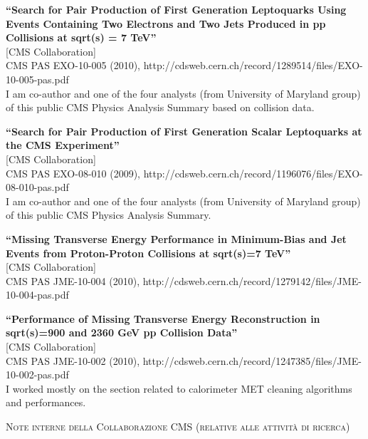 \documentclass[10pt, a4paper]{article}
\begin{document}
\begin{thebibliography}{599}
{\bf ``Search for Pair Production of First Generation Leptoquarks Using Events Containing Two Electrons and Two Jets Produced in pp Collisions at sqrt(s) = 7 TeV''}
  \\{}[CMS Collaboration]
  \\{}CMS PAS EXO-10-005 (2010), http://cdsweb.cern.ch/record/1289514/files/EXO-10-005-pas.pdf 
  \\I am co-author and one of the four analysts (from University of Maryland group) of this public CMS Physics Analysis Summary based on collision data.

{\bf ``Search for Pair Production of First Generation Scalar Leptoquarks at the CMS Experiment''}
  \\{}[CMS Collaboration]
  \\{}CMS PAS EXO-08-010 (2009), http://cdsweb.cern.ch/record/1196076/files/EXO-08-010-pas.pdf
  \\I am co-author and one of the four analysts (from University of Maryland group) of this public CMS Physics Analysis Summary.

{\bf ``Missing Transverse Energy Performance in Minimum-Bias and Jet Events from Proton-Proton Collisions at sqrt(s)=7 TeV''}
  \\{}[CMS Collaboration]
  \\{}CMS PAS JME-10-004 (2010), http://cdsweb.cern.ch/record/1279142/files/JME-10-004-pas.pdf 

{\bf ``Performance of Missing Transverse Energy Reconstruction in sqrt(s)=900 and 2360 GeV pp Collision Data''}
  \\{}[CMS Collaboration]
  \\{}CMS PAS JME-10-002 (2010), http://cdsweb.cern.ch/record/1247385/files/JME-10-002-pas.pdf 
  \\ I worked mostly on the section related to calorimeter MET cleaning algorithms and performances.

\vspace{0.1cm} \begin{center} \textsc{Note interne della Collaborazione CMS (relative alle attivit\`a di ricerca)} \end{center} \vspace{0.05cm}


\end{thebibliography}
\end{document}
